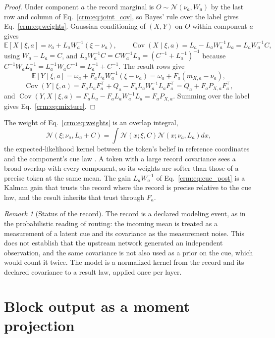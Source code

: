 \documentclass[11pt]{article}
\theoremstyle{definition}
\theoremstyle{remark}
\newtheorem{remark}[theorem]{Remark}
\newcommand{\E}{\mathbb E}
\newcommand{\Gauss}{\mathcal N}
\newcommand{\Cov}{\operatorname{Cov}}
\begin{document}
\begin{proof}
Under component $a$ the record marginal is $O\sim\Gauss(\nu_a,W_a)$ by the last row and column of Eq.~\eqref{crm:eq:joint_cov}, so Bayes' rule over the label gives Eq.~\eqref{crm:eq:weights}. Gaussian conditioning \citep[Sec.~2.3]{Bishop2006} of $(X,Y)$ on $O$ within component $a$ gives
\[
\E[X\mid\xi,a]=\nu_a+L_aW_a^{-1}(\xi-\nu_a),\qquad
\Cov(X\mid\xi,a)=L_a-L_aW_a^{-1}L_a=L_aW_a^{-1}C,
\]
using $W_a-L_a=C$, and $L_aW_a^{-1}C=CW_a^{-1}L_a=(C^{-1}+L_a^{-1})^{-1}$ because $C^{-1}W_aL_a^{-1}=L_a^{-1}W_aC^{-1}=L_a^{-1}+C^{-1}$. The result rows give
\[
\E[Y\mid\xi,a]=\omega_a+F_aL_aW_a^{-1}(\xi-\nu_a)=\omega_a+F_a(m_{X,a}-\nu_a),
\]
\[
\Cov(Y\mid\xi,a)=F_aL_aF_a^\top+Q_a-F_aL_aW_a^{-1}L_aF_a^\top=Q_a+F_aP_{X,a}F_a^\top,
\]
and $\Cov(Y,X\mid\xi,a)=F_aL_a-F_aL_aW_a^{-1}L_a=F_aP_{X,a}$. Summing over the label gives Eq.~\eqref{crm:eq:mixture}.
\end{proof}

The weight of Eq.~\eqref{crm:eq:weights} is an overlap integral,
\begin{equation}
\Gauss(\xi;\nu_a,L_a+C)=\int\Gauss(x;\xi,C)\Gauss(x;\nu_a,L_a)dx,
\label{crm:eq:overlap}
\end{equation}
the expected-likelihood kernel between the token's belief in reference coordinates and the component's cue law \citep{Jebara2004ProbabilityProduct}. A token with a large record covariance sees a broad overlap with every component, so its weights are softer than those of a precise token at the same mean. The gain $L_aW_a^{-1}$ of Eq.~\eqref{crm:eq:cue_post} is a Kalman gain \citep{Kalman1960} that trusts the record where the record is precise relative to the cue law, and the result inherits that trust through $F_a$.

\begin{remark}[Status of the record]
\label{crm:rem:record}
The record is a declared modeling event, as in the probabilistic reading of routing: the incoming mean is treated as a measurement of a latent cue and its covariance as the measurement noise. This does not establish that the upstream network generated an independent observation, and the same covariance is not also used as a prior on the cue, which would count it twice. The model is a normalized kernel from the record and its declared covariance to a result law, applied once per layer.
\end{remark}

\section{Block output as a moment projection}
\label{crm:sec:output}
\end{document}
